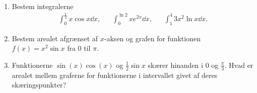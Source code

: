 \begin{enumerate}
		\item Bestem integralerne
	\begin{align*}
	\int_0^{\frac{\pi}{2}} x\cos x\dd x,&& \int_0^{\ln 2} x e^{2x} \dd x,&& \int_1^4 3x^2\ln x\dd x.
	\end{align*}
	
		\item Bestem arealet afgrænset af $x$-aksen og grafen for funktionen $f(x)=x^2\sin x$ fra $0$ til $\pi$.
		
			\item Funktionerne $\sin(x)\cos(x)$ og $\frac{1}{2}\sin x$ skærer hinanden i $0$ og $\frac{\pi}{3}$. Hvad er arealet mellem graferne for funktionerne i intervallet givet af deres skæringspunkter?
\end{enumerate}